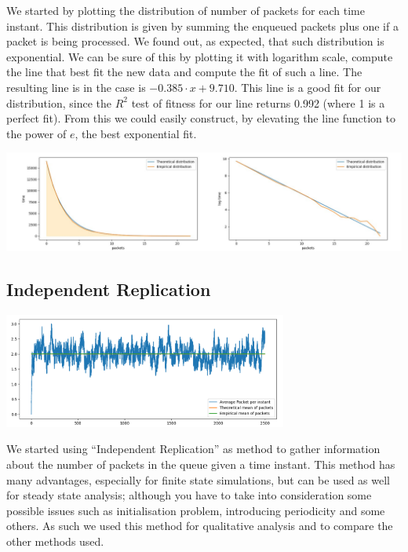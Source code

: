 \documentclass[10pt,a4paper]{article}
\begin{document}
We started by plotting the distribution of number of packets for each time instant. This distribution is given by summing the enqueued packets plus one if a packet is being processed. We found out, as expected, that such distribution is exponential. We can be sure of this by plotting it with logarithm scale, compute the line that best fit the new data and compute the fit of such a line. The resulting line is in the case  is \(-0.385 \cdot x +  9.710\). This line is a good fit for our distribution, since the \(R^2\) test of fitness for our line returns 0.992 (where 1 is a perfect fit).
From this we could easily construct, by elevating the line function to the power of \(e\), the best exponential fit.
\begin{center}
	\includegraphics[width=\textwidth]{img/time-with-fixed-packet-n.png}
	\label{fig:time-with-fixed-packet-n}
\end{center}


\subsection*{Independent Replication}

\begin{center}
	\includegraphics[width=0.7\textwidth]{independent-replication-with-bias.png}
	\label{fig:independent-replication-with-bias}
\end{center}

We started using ``Independent Replication'' as method to gather information about the number of packets in the queue given a time instant. This method has many advantages, especially for finite state simulations, but can be used as well for steady state analysis; although you have to take into consideration some possible issues such as initialisation problem, introducing periodicity and some others. As such we used this method for qualitative analysis and to compare the other methods used.
\end{document}

